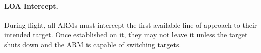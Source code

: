 



\paragraph{LOA Intercept.} During flight, all ARMs must intercept the first available line of approach to their intended target. Once established on it, they may not leave it unless the target shuts down and the ARM is capable of switching targets.

